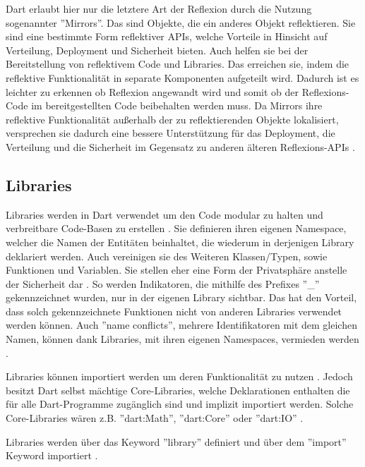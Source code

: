 \noindent
Dart erlaubt hier nur die letztere Art der Reflexion durch die Nutzung sogenannter ''Mirrors''.
Das sind Objekte, die ein anderes Objekt reflektieren. Sie sind eine bestimmte Form reflektiver APIs, welche Vorteile in Hinsicht auf Verteilung, Deployment und Sicherheit bieten.
Auch helfen sie bei der Bereitstellung von reflektivem Code und Libraries. Das erreichen sie, indem die reflektive Funktionalität in separate Komponenten aufgeteilt wird.
Dadurch ist es leichter zu erkennen ob Reflexion angewandt wird und somit ob der Reflexions-Code im bereitgestellten Code beibehalten werden muss.
Da Mirrors ihre reflektive Funktionalität außerhalb der zu reflektierenden Objekte lokalisiert, versprechen sie dadurch eine bessere Unterstützung für das Deployment, die Verteilung und die Sicherheit im Gegensatz zu anderen älteren Reflexions-APIs \cite{book:Dart:DPL_GiladBracha}.

\subsection{Libraries}
\label{subsec:Dart:Libraries}
Libraries werden in Dart verwendet um den Code modular zu halten und verbreitbare Code-Basen zu erstellen \cite{book:Dart:DPL_GiladBracha, book:Dart:StartGuideDart_SanjibSinha}.
Sie definieren ihren eigenen Namespace, welcher die Namen der Entitäten beinhaltet, die wiederum in derjenigen Library deklariert werden.
Auch vereinigen sie des Weiteren Klassen/Typen, sowie Funktionen und Variablen.
Sie stellen eher eine Form der Privatsphäre anstelle der Sicherheit dar \cite{book:Dart:DPL_GiladBracha}.
So werden Indikatoren, die mithilfe des Prefixes ''\_'' gekennzeichnet wurden, nur in der eigenen Library sichtbar.
Das hat den Vorteil, dass solch gekennzeichnete Funktionen nicht von anderen Libraries verwendet werden können.
Auch ''name conflicts'', mehrere Identifikatoren mit dem gleichen Namen, können dank Libraries, mit ihren eigenen Namespaces, vermieden werden \cite{book:Dart:StartGuideDart_SanjibSinha}.

\noindent
Libraries können importiert werden um deren Funktionalität zu nutzen \cite{book:Dart:DPL_GiladBracha}.
Jedoch besitzt Dart selbst mächtige Core-Libraries, welche Deklarationen enthalten die für alle Dart-Programme zugänglich sind und implizit importiert werden.
Solche Core-Libraries wären z.B. ''dart:Math'', ''dart:Core'' oder ''dart:IO'' \cite{book:Dart:StartGuideDart_SanjibSinha}.

\noindent
Libraries werden über das Keyword ''library'' definiert und über dem ''import'' Keyword importiert \cite{book:Dart:StartGuideDart_SanjibSinha, book:Dart:DPL_GiladBracha}.

